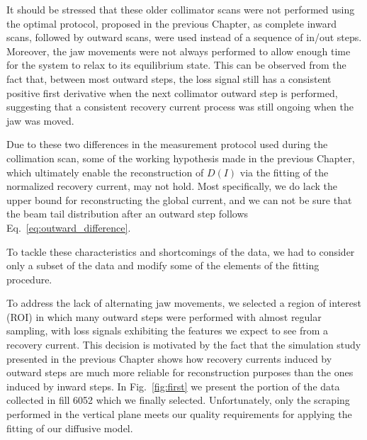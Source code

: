 It should be stressed that these older collimator scans were not performed using the optimal protocol, proposed in the previous Chapter, as complete inward scans, followed by outward scans, were used instead of a sequence of in/out steps. Moreover, the jaw movements were not always performed to allow enough time for the system to relax to its equilibrium state. This can be observed from the fact that, between most outward steps, the loss signal still has a consistent positive first derivative when the next collimator outward step is performed, suggesting that a consistent recovery current process was still ongoing when the jaw was moved.

Due to these two differences in the measurement protocol used during the collimation scan, some of the working hypothesis made in the previous Chapter, which ultimately enable the reconstruction of $D(I)$ via the fitting of the normalized recovery current, may not hold. Most specifically, we do lack the upper bound for reconstructing the global current, and we can not be sure that the beam tail distribution after an outward step follows Eq.~\eqref{eq:outward_difference}.

To tackle these characteristics and shortcomings of the data, we had to consider only a subset of the data and modify some of the elements of the fitting procedure. 

To address the lack of alternating jaw movements, we selected a region of interest (ROI) in which many outward steps were performed with almost regular sampling, with loss signals exhibiting the features we expect to see from a recovery current. This decision is motivated by the fact that the simulation study presented in the previous Chapter shows how recovery currents induced by outward steps are much more reliable for reconstruction purposes than the ones induced by inward steps. In Fig.~\ref{fig:first} we present the portion of the data collected in fill 6052 which we finally selected. Unfortunately, only the scraping performed in the vertical plane meets our quality requirements for applying the fitting of our diffusive model.

